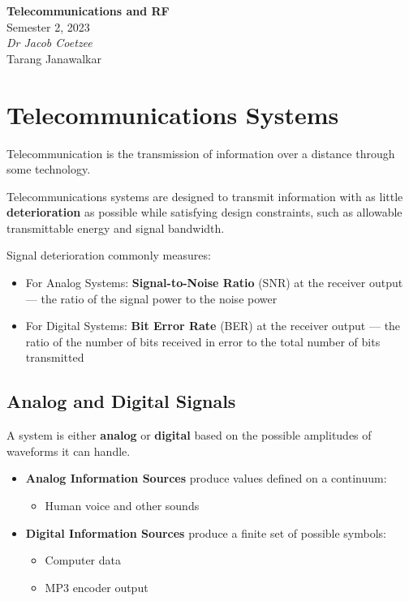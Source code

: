 \documentclass{article}
\date{}
\newcommand{\unitName}{Telecommunications and RF}
\newcommand{\unitTime}{Semester 2, 2023}
\newcommand{\unitCoordinator}{Dr Jacob Coetzee}
\newcommand{\documentAuthors}{Tarang Janawalkar}
\begin{document}
%
\begin{titlepage}
    \vspace*{\fill}
    \begin{center}
        \LARGE{\textbf{\unitName}} \\[0.1in]
        \normalsize{\unitTime} \\[0.2in]
        \normalsize\textit{\unitCoordinator} \\[0.2in]
        \documentAuthors
    \end{center}
    \vspace*{\fill}
    \doclicenseThis
    \thispagestyle{empty}
\end{titlepage}
\newpage
%
\tableofcontents
\newpage
%
\section{Telecommunications Systems}
Telecommunication is the transmission of information over a distance through some technology.

Telecommunications systems are designed to transmit information with
as little \textbf{deterioration} as possible while satisfying design constraints, such as
allowable transmittable energy and signal bandwidth.

Signal deterioration commonly measures:
\begin{itemize}
    \item For Analog Systems: \textbf{Signal-to-Noise Ratio} (SNR) at the receiver output --- the ratio of the signal power to the noise power
    \item For Digital Systems: \textbf{Bit Error Rate} (BER) at the receiver output --- the ratio of the number of bits received in error to the total number of bits transmitted
\end{itemize}
\subsection{Analog and Digital Signals}
A system is either \textbf{analog} or \textbf{digital} based on the possible amplitudes of waveforms it can handle.
\begin{itemize}
    \item \textbf{Analog Information Sources} produce values defined on a continuum:
          \begin{itemize}
              \item Human voice and other sounds
          \end{itemize}
    \item \textbf{Digital Information Sources} produce a finite set of possible symbols:
          \begin{itemize}
              \item Computer data
              \item MP3 encoder output
          \end{itemize}
\end{itemize}
\end{document}
